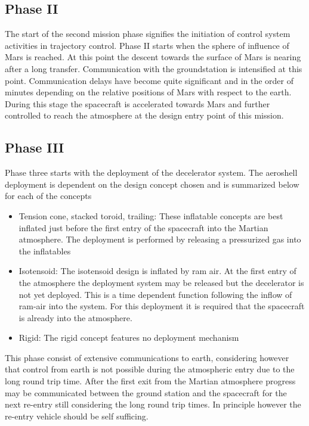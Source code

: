 \subsection{Phase II}\label{sec:p2}
The start of the second mission phase signifies the initiation of control system activities in trajectory control. Phase II starts when the sphere of influence of Mars is reached.  At this point the descent towards the surface of Mars is nearing after a long transfer. Communication  with the groundstation is intensified at this point. Communication delays have become quite significant and in the order of minutes depending on the relative positions of Mars with respect to the earth.  
During this stage the spacecraft is accelerated towards Mars and further controlled to reach the atmosphere at the design entry point of this mission. 

\subsection{Phase III}\label{sec:p3}

Phase three starts with the deployment of the decelerator system. The aeroshell deployment is dependent on the design concept chosen and is summarized below for each of the concepts 

\begin{itemize}
\item Tension cone, stacked toroid, trailing: These inflatable concepts are best inflated just before the first entry of the spacecraft into the Martian atmosphere. The deployment is performed by releasing a pressurized gas into the inflatables
\item Isotensoid: The isotensoid design is inflated by ram air. At the first entry of the atmosphere the deployment system may be released but the decelerator is not yet deployed. This is a time dependent function following the inflow of ram-air into the system. For this deployment it is required that the spacecraft is already into the atmosphere.
\item Rigid: The rigid concept features no deployment mechanism
\end{itemize}

This phase consist of extensive communications to earth, considering however that control from earth is not possible during the atmospheric entry due to the long round trip time. After the first exit from the Martian atmosphere progress may be communicated between the ground station and the spacecraft for the next re-entry still considering the long round trip times. In principle however the re-entry vehicle should be self sufficing.

